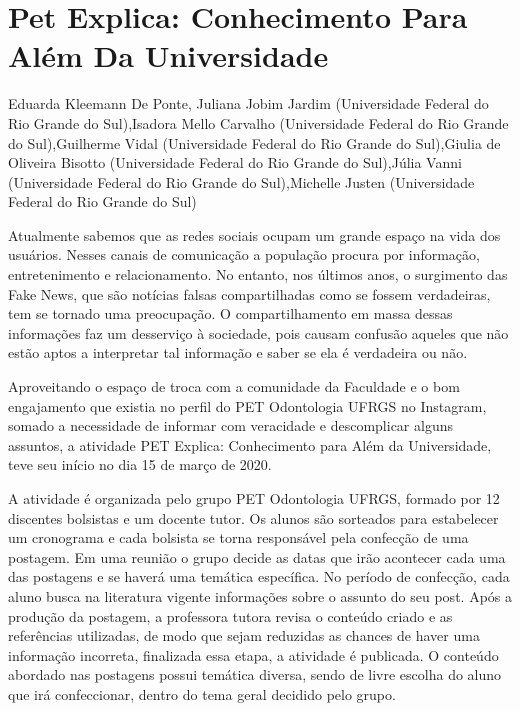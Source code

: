 


\section*{Pet Explica: Conhecimento Para Além Da Universidade}

Eduarda Kleemann De Ponte, Juliana Jobim Jardim (Universidade Federal do Rio Grande do Sul),Isadora Mello Carvalho (Universidade Federal do Rio Grande do Sul),Guilherme Vidal (Universidade Federal do Rio Grande do Sul),Giulia de Oliveira Bisotto (Universidade Federal do Rio Grande do Sul),Júlia Vanni (Universidade Federal do Rio Grande do Sul),Michelle Justen (Universidade Federal do Rio Grande do Sul)

Atualmente sabemos que as redes sociais ocupam um grande espaço na vida dos usuários. Nesses canais de comunicação a população procura por informação, entretenimento e relacionamento. No entanto, nos últimos anos, o surgimento das Fake News, que são notícias falsas compartilhadas como se fossem verdadeiras, tem se tornado uma preocupação. O compartilhamento em massa dessas informações faz um desserviço à sociedade, pois causam confusão aqueles que não estão aptos a interpretar tal informação e saber se ela é verdadeira ou não.

Aproveitando o espaço de troca com a comunidade da Faculdade e o bom engajamento que existia no perfil do PET Odontologia UFRGS no Instagram, somado a necessidade de informar com veracidade e descomplicar alguns assuntos, a atividade PET Explica: Conhecimento para Além da Universidade, teve seu início no dia 15 de março de 2020.

A atividade é organizada pelo grupo PET Odontologia UFRGS, formado por 12 discentes bolsistas e um docente tutor. Os alunos são sorteados para estabelecer um cronograma e cada bolsista se torna responsável pela confecção de uma postagem. Em uma reunião o grupo decide as datas que irão acontecer cada uma das postagens e se haverá uma temática específica. No período de confecção, cada aluno busca na literatura vigente informações sobre o assunto do seu post. Após a produção da postagem, a professora tutora revisa o conteúdo criado e as referências utilizadas, de modo que sejam reduzidas as chances de haver uma informação incorreta, finalizada essa etapa, a atividade é publicada. O conteúdo abordado nas postagens possui temática diversa, sendo de livre escolha do aluno que irá confeccionar, dentro do tema geral decidido pelo grupo.

